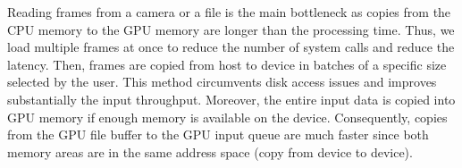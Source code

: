Reading frames from a camera or a file is the main bottleneck as copies from the CPU memory to the GPU memory are longer than the processing time. Thus, we load multiple frames at once to reduce the number of system calls and reduce the latency. Then, frames are copied from host to device in batches of a specific size selected by the user. This method circumvents disk access issues and improves substantially the input throughput. Moreover, the entire input data is copied into GPU memory if enough memory is available on the device. Consequently, copies from the GPU file buffer to the GPU input queue are much faster since both memory areas are in the same address space (copy from device to device).